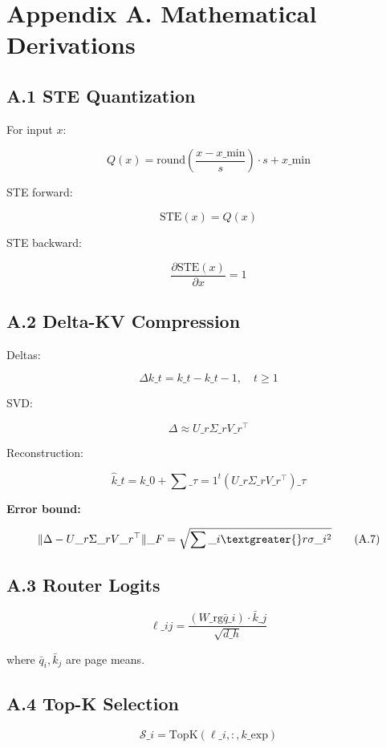 \section{Appendix A. Mathematical Derivations}

\subsection{A.1 STE Quantization}

For input $x$:

\[
Q(x) = \text{round}\!\left(\frac{x - x\_\text{min}}{s}\right) \cdot s + x\_\text{min}
\tag{A.1}
\]

STE forward:

\[
\text{STE}(x) = Q(x)
\tag{A.2}
\]

STE backward:

\[
\frac{\partial \text{STE}(x)}{\partial x} = 1
\tag{A.3}
\]

\subsection{A.2 Delta-KV Compression}

Deltas:

\[
\Delta k\_t = k\_t - k\_{t-1}, \quad t \geq 1
\tag{A.4}
\]

SVD:

\[
\Delta \approx U\_r \Sigma\_r V\_r^\top
\tag{A.5}
\]

Reconstruction:

\[
\hat{k}\_t = k\_0 + \sum\_{\tau=1}^t (U\_r \Sigma\_r V\_r^\top)\_\tau
\tag{A.6}
\]

\textbf{Error bound:}

\[
\|\Delta - U\_r \Sigma\_r V\_r^\top\|\_F = \sqrt{\sum\_{i \textgreater{} r} \sigma\_i^2}
\tag{A.7}
\]

\subsection{A.3 Router Logits}

\[
\ell\_{ij} = \frac{(W\_\text{rg} \bar{q}\_i) \cdot \bar{k}\_j}{\sqrt{d\_h}}
\tag{A.8}
\]

where $\bar{q}_i, \bar{k}_j$ are page means.

\subsection{A.4 Top-K Selection}

\[
\mathcal{S}\_i = \text{TopK}(\ell\_{i, :}, k\_\text{exp})
\tag{A.9}
\]

